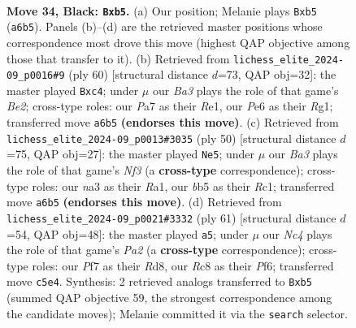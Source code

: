 \documentclass[11pt]{article}
\begin{document}
\clearpage

\begin{figure}[p]\centering
\begin{subfigure}{0.46\textwidth}\centering
\resizebox{\linewidth}{!}{%
\newchessgame
\chessboard[
  setfen={1rr5/p4p1k/bp2p1pp/1Bn5/2P5/N1B1P2P/PR3PP1/5K1R b - - 14 34},
  showmover=false,
  pgfstyle=straightmove, color=movearrow, markmove={a6-b5}
]}
\caption{}
\end{subfigure}\hfill
\begin{subfigure}{0.46\textwidth}\centering
\resizebox{\linewidth}{!}{%
\newchessgame
\chessboard[
  setfen={3rr1k1/2p2pp1/p7/1p2nPP1/2b5/P1N5/1PP1B3/2K1R1R1 w - - 2 31},
  showmover=false,
  pgfstyle=straightmove, color=movearrow, markmove={e2-c4}
]}
\caption{}
\end{subfigure}
\\[4pt]
\begin{subfigure}{0.46\textwidth}\centering
\resizebox{\linewidth}{!}{%
\newchessgame
\chessboard[
  setfen={2r1r1k1/1p3ppp/pb6/3p4/3Pb3/P3PN1P/4BPP1/R1R3K1 w - - 0 26},
  showmover=false,
  pgfstyle=straightmove, color=movearrow, markmove={f3-e5}
]}
\caption{}
\end{subfigure}\hfill
\begin{subfigure}{0.46\textwidth}\centering
\resizebox{\linewidth}{!}{%
\newchessgame
\chessboard[
  setfen={3r4/pk1r4/1p3pn1/3pbNpp/3B4/2PR2PP/PP3PK1/3R4 b - - 0 31},
  showmover=false,
  pgfstyle=straightmove, color=movearrow, markmove={a7-a5}
]}
\caption{}
\end{subfigure}
\caption{\textbf{Move 34, Black: \texttt{Bxb5}.} (a) Our position; Melanie plays \texttt{Bxb5} (\texttt{a6b5}). Panels (b)--(d) are the retrieved master positions whose correspondence most drove this move (highest QAP objective among those that transfer to it). (b) Retrieved from \texttt{lichess\_elite\_2024-09\_p0016\#9} (ply 60) [structural distance $d$=73, QAP obj=32]: the master played \texttt{Bxc4}; under $\mu$ our \emph{Ba3} plays the role of that game's \emph{Be2}; cross-type roles: our \emph{P}a7 as their \emph{R}e1, our \emph{P}e6 as their \emph{R}g1; transferred move \texttt{a6b5} \textbf{(endorses this move)}. (c) Retrieved from \texttt{lichess\_elite\_2024-09\_p0013\#3035} (ply 50) [structural distance $d$=75, QAP obj=27]: the master played \texttt{Ne5}; under $\mu$ our \emph{Ba3} plays the role of that game's \emph{Nf3} (a \textbf{cross-type} correspondence); cross-type roles: our \emph{n}a3 as their \emph{R}a1, our \emph{b}b5 as their \emph{R}c1; transferred move \texttt{a6b5} \textbf{(endorses this move)}. (d) Retrieved from \texttt{lichess\_elite\_2024-09\_p0021\#3332} (ply 61) [structural distance $d$=54, QAP obj=48]: the master played \texttt{a5}; under $\mu$ our \emph{Nc4} plays the role of that game's \emph{Pa2} (a \textbf{cross-type} correspondence); cross-type roles: our \emph{P}f7 as their \emph{R}d8, our \emph{R}c8 as their \emph{P}f6; transferred move \texttt{c5e4}. Synthesis: 2 retrieved analogs transferred to \texttt{Bxb5} (summed QAP objective 59, the strongest correspondence among the candidate moves); Melanie committed it via the \texttt{search} selector.}
\label{fig:thought-m67}
\end{figure}
\end{document}
